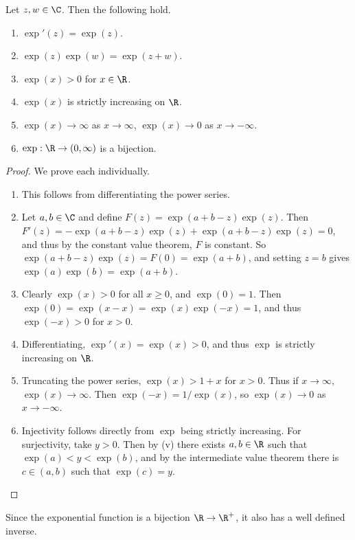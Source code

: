 \documentclass[a4paper]{scrartcl}
\begin{document}
\begin{proposition}\label{prop:exp}
	Let $z, w \in \C$. Then the following hold.
	\begin{enumerate}[label=(\roman*)]
		\item $\exp'(z) = \exp(z)$.
		\item $\exp(z)\exp(w) = \exp(z + w)$.
		\item $\exp(x) > 0$ for $x \in \R$.
		\item $\exp(x)$ is strictly increasing on $\R$.
		\item $\exp(x) \rightarrow \infty$ as $x \rightarrow \infty$, $\exp(x) \rightarrow 0$ as $x \rightarrow -\infty$.
		\item $\exp: \R \rightarrow (0, \infty)$ is a bijection.
	\end{enumerate}
\end{proposition}
\begin{proof}
	We prove each individually.
	\begin{enumerate}[label=(\roman*)]
		\item This follows from differentiating the power series.
		\item Let $a, b \in \C$ and define $F(z) = \exp(a + b - z)\exp(z)$. Then $F'(z) = -\exp(a + b - z)\exp(z) + \exp(a + b - z)\exp(z) = 0$, and thus by the constant value theorem, $F$ is constant. So $\exp(a + b - z)\exp(z) = F(0) = \exp(a +  b)$, and setting $z = b$ gives $\exp(a) \exp(b) = \exp(a + b)$.
		\item Clearly $\exp(x) > 0$ for all $x \geq 0$, and $\exp(0) = 1$. Then $\exp(0) = \exp(x - x) = \exp(x) \exp(-x) = 1$, and thus $\exp(-x) > 0$ for $x > 0$.
		\item Differentiating, $\exp'(x) = \exp(x) > 0$, and thus $\exp$ is strictly increasing on $\R$.
		\item Truncating the power series, $\exp(x) > 1 + x$ for $x > 0$. Thus if $x \rightarrow \infty$, $\exp(x) \rightarrow \infty$. Then $\exp(-x) = 1/\exp (x)$, so $\exp(x) \rightarrow 0$ as $x \rightarrow - \infty$.
		\item Injectivity follows directly from $\exp$ being strictly increasing. For surjectivity, take $y > 0$. Then by (v) there exists $a, b \in \R$ such that $\exp(a) < y < \exp(b)$, and by the intermediate value theorem there is $c \in (a, b)$ such that $\exp(c) = y$. \qedhere
	\end{enumerate}
\end{proof}

Since the exponential function is a bijection $\R \rightarrow \R^+$, it also has a well defined inverse.
\end{document}
